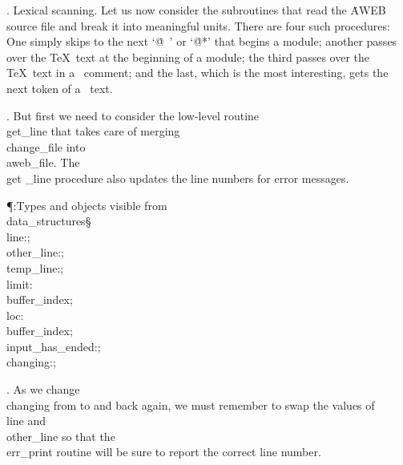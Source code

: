 .  Lexical scanning.
Let us now consider the subroutines that read the \.{AWEB} source file
and break it into meaningful units. There are four such procedures:
One simply skips to the next `\.{@\ }' or `\.{@*}' that begins a
module; another passes over the \TeX\ text at the beginning of a
module; the third passes over the \TeX\ text in a \ADA\ comment;
and the last, which is the most interesting, gets the next token of
a \ADA\ text.

\fi

. But first we need to consider the low-level routine \\{get\_line}
that takes care of merging \\{change\_file} into \\{aweb\_file}. The \\{get%
\_line}
procedure also updates the line numbers for error messages.

\Y\P\?\4:Types and objects visible from \\{data\_structures}\X\mathrel{+}\S%
\?\6
\\{line}\?:\?;%
\6
\\{other\_line}\?:\?;\6
\\{temp\_line}\?:\?;\6
\\{limit}\?:\?\\{buffer\_index};\6
\\{loc}\?:\?\\{buffer\_index};\6
\\{input\_has\_ended}\?:\?;\6
\\{changing}\?:\?;\par
\fi

. As we change \\{changing} from  to  and back again, we
must
remember to swap the values of \\{line} and \\{other\_line} so that the
\\{err\_print} routine will be sure to report the correct line number.

